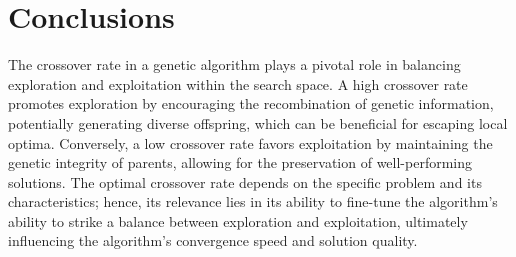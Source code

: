 \documentclass[10pt,a4paper]{article}
\begin{document}
\section{Conclusions}
The crossover rate in a genetic algorithm plays a pivotal role in balancing exploration and exploitation within the search space. A high crossover rate promotes exploration by encouraging the recombination of genetic information, potentially generating diverse offspring, which can be beneficial for escaping local optima. Conversely, a low crossover rate favors exploitation by maintaining the genetic integrity of parents, allowing for the preservation of well-performing solutions. The optimal crossover rate depends on the specific problem and its characteristics; hence, its relevance lies in its ability to fine-tune the algorithm's ability to strike a balance between exploration and exploitation, ultimately influencing the algorithm's convergence speed and solution quality.
\end{document}
